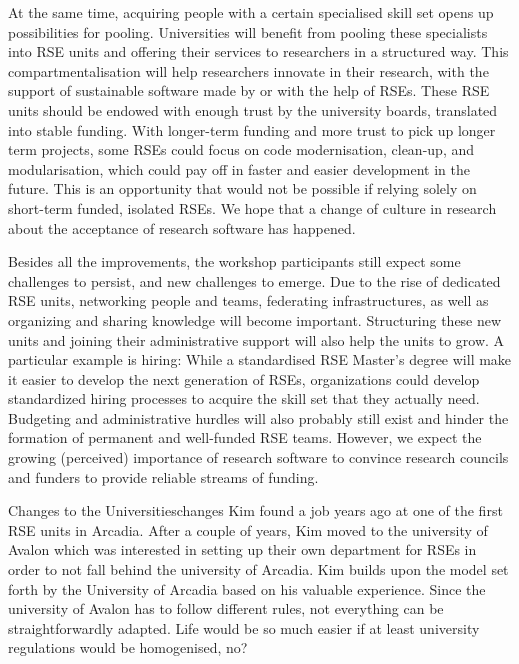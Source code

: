 \documentclass{eceasst}
\begin{document}
At the same time, acquiring people with a certain specialised skill set
opens up possibilities for pooling.
Universities will benefit from pooling these specialists into RSE units
and offering their services to researchers in a structured way.
This compartmentalisation will help researchers innovate in their research,
with the support of sustainable software made by or with the help of RSEs.
These RSE units should be endowed with enough trust by the university boards, translated into stable funding.
With longer-term funding and more trust to pick up longer term projects,
some RSEs could focus on code modernisation, clean-up, and modularisation,
which could pay off in faster and easier development in the future.
This is an opportunity that would not be possible if relying solely on short-term funded, isolated RSEs.
We hope that a change of culture in research about the acceptance of research software has happened.

Besides all the improvements, the workshop participants still expect some challenges to persist,
and new challenges to emerge.
Due to the rise of dedicated RSE units, networking people and teams,
federating infrastructures, as well as organizing and sharing knowledge will become important.
Structuring these new units and joining their administrative support will also help the units to grow.
A particular example is hiring:
While a standardised RSE Master's degree will make it easier to develop the next generation of RSEs,
organizations could develop standardized hiring processes to acquire the skill set that they actually need.
Budgeting and administrative hurdles will also probably still exist and hinder the formation of permanent and well-funded RSE teams.
However, we expect the growing (perceived) importance of research software
to convince research councils and funders to provide reliable streams of funding.

\begin{story}{Changes to the Universities}{changes}
Kim found a job years ago at one of the first RSE units in Arcadia. After a couple of years, Kim moved to the university of
Avalon which was interested in setting up their own department for RSEs in order to not fall behind the university of Arcadia.
Kim builds upon the model set forth by the University of Arcadia based on his valuable experience. Since the university
of Avalon has to follow different rules, not everything can be straightforwardly adapted. Life would be so much easier
if at least university regulations would be homogenised, no?
\end{story}
\end{document}
